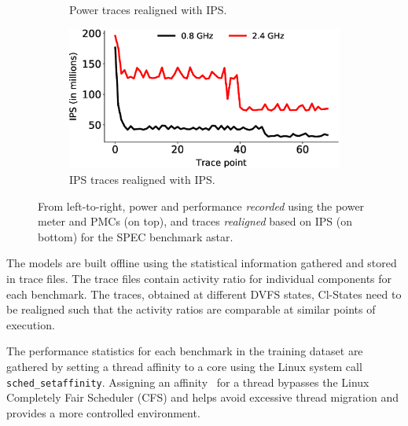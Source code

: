 \begin{figure}[ht]
\begin{subfigure}{0.48\textwidth}
        \caption{Power traces realigned with IPS.} 
        \label{fig: astarpowerrealign}
    \end{subfigure} 
    \begin{subfigure}{0.48\textwidth} 
        \centering
        \includegraphics[width=\textwidth]{Chapter3/Figs/trace-files/new/perf_realign.eps}
        \caption{IPS traces realigned with IPS.} 
        \label{fig: astarmipsrealign} 
    \end{subfigure}
    \caption[Traces to build multi linear regression models]{ From
left-to-right, power and performance \textit{recorded} using the power meter and PMCs
(on top), and traces \textit{realigned} based on IPS (on bottom) for the SPEC benchmark
astar.} \label{fig: tracefile-astar} \end{figure} 


The models are built offline using the statistical information gathered and stored in
trace files. The trace files contain activity ratio for individual components for each
benchmark. The traces, obtained at different DVFS states, Cl-States need to be realigned
such that the activity ratios are comparable at similar points of execution. 

 The performance statistics for each benchmark in the training dataset are
gathered by setting a thread affinity to a core using the Linux system call
\texttt{sched\_setaffinity}.  Assigning an affinity~\citep{LinuxKernel} for a thread
bypasses the Linux Completely Fair Scheduler (CFS) and helps avoid excessive thread
migration and provides a more controlled environment.

